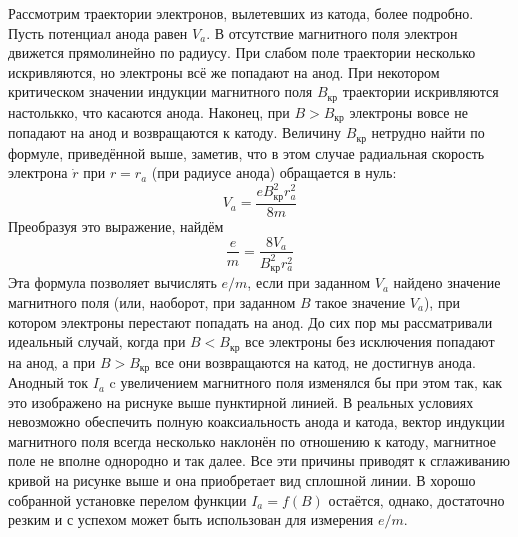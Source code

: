 \documentclass[a4paper, 12pt]{article}
\begin{document}
Рассмотрим траектории электронов, вылетевших из катода, более подробно. Пусть потенциал анода равен $V_a$. В отсутствие магнитного поля электрон движется прямолинейно по радиусу. При слабом поле траектории несколько искривляются, но электроны всё же попадают на анод. При некотором критическом значении индукции магнитного поля $B_\text{кр}$ траектории искривляются настолькко, что касаются анода. Наконец, при $B > B_\text{кр}$ электроны вовсе не попадают на анод и возвращаются к катоду. Величину $B_\text{кр}$ нетрудно найти по формуле, приведённой выше, заметив, что в этом случае радиальная скорость электрона $\dot r$ при $r = r_a$ (при радиусе анода) обращается в нуль:
\begin{equation}
	V_a = \frac{e B_\text{кр}^2 r_a^2}{8 m}
\end{equation}
Преобразуя это выражение, найдём 
\begin{equation}
	\frac{e}{m} = \frac{8 V_a}{B_\text{кр}^2 r_a^2}
\end{equation}
Эта формула позволяет вычислять $e / m$, если при заданном $V_a$ найдено значение магнитного поля (или, наоборот, при заданном $B$ такое значение $V_a$), при котором электроны перестают попадать на анод.
До сих пор мы рассматривали идеальный случай, когда при $B < B_\text{кр}$ все электроны без исключения попадают на анод, а при $B > B_\text{кр}$ все они возвращаются на катод, не достигнув анода. Анодный ток $I_a$ c увеличением магнитного поля изменялся бы при этом так, как это изображено на риснуке выше пунктирной линией. В реальных условиях невозможно обеспечить полную коаксиальность анода и катода, вектор индукции магнитного поля всегда несколько наклонён по отношению к катоду, магнитное поле не вполне однородно и так далее. Все эти причины приводят к сглаживанию кривой на рисунке выше и она приобретает вид сплошной линии. В хорошо собранной установке перелом функции $I_a = f(B)$ остаётся, однако, достаточно резким и с успехом может быть использован для измерения $e / m$.
\end{document}
